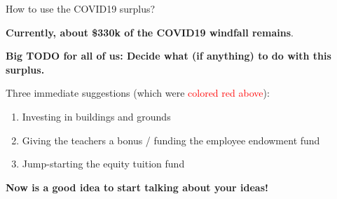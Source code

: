 \documentclass[8pt]{beamer}
\begin{document}

\begin{frame}{How to use the COVID19 surplus?}

\textbf{Currently, about \$330k of the COVID19 windfall remains}.

\textbf{Big TODO for all of us: Decide what (if
anything) to do with this surplus.}

Three immediate suggestions (which were \textcolor{red}{colored red above}):
%
\begin{enumerate}
%
\item Investing in buildings and grounds
\item Giving the teachers a bonus / funding the employee endowment fund
\item Jump-starting the equity tuition fund
%
\end{enumerate}
%
\textbf{Now is a good idea to start talking about your ideas!}


\end{frame}
\end{document}
